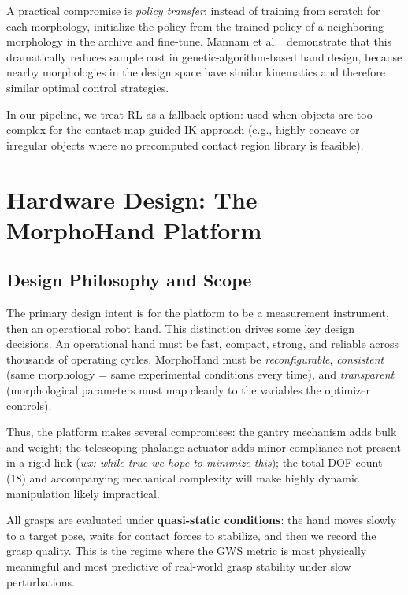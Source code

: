 \documentclass[journal]{IEEEtran}
\begin{document}
A practical compromise is \emph{policy transfer}: instead of training from scratch for each
morphology, initialize the policy from the trained policy of a neighboring morphology in
the archive and fine-tune.
Mannam et al.~\cite{mannam2024codesign} demonstrate that this dramatically reduces sample
cost in genetic-algorithm-based hand design, because nearby morphologies in the design
space have similar kinematics and therefore similar optimal control strategies.

In our pipeline, we treat RL as a fallback option: used when objects are too complex for
the contact-map-guided IK approach (e.g., highly concave or irregular objects where no
precomputed contact region library is feasible).

\section{Hardware Design: The MorphoHand Platform}
\label{sec:hardware}

\subsection{Design Philosophy and Scope}

The primary design intent is for the platform to be a measurement instrument, then an operational robot hand.
This distinction drives some key design decisions.
An operational hand must be fast, compact, strong, and reliable across thousands of
operating cycles.
MorphoHand must be \emph{reconfigurable}, \emph{consistent} (same morphology = same
experimental conditions every time), and \emph{transparent} (morphological parameters
must map cleanly to the variables the optimizer controls).

Thus, the platform makes several compromises: the gantry mechanism adds bulk and weight; the telescoping phalange actuator adds
minor compliance not present in a rigid link (\textit{wx: while true we hope to minimize this}); the total DOF count (18) and accompanying mechanical complexity will make highly dynamic manipulation likely impractical.

All grasps are evaluated under \textbf{quasi-static conditions}: the hand moves slowly
to a target pose, waits for contact forces to stabilize, and then we record the grasp
quality.
This is the regime where the GWS metric is most physically meaningful and most predictive
of real-world grasp stability under slow perturbations.
\end{document}
